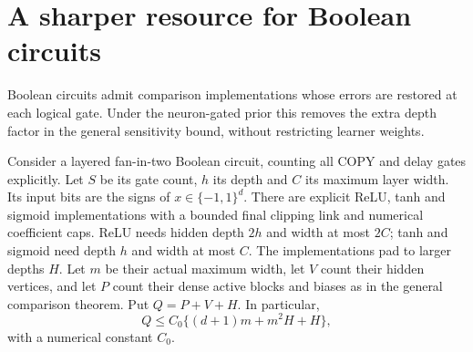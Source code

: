 \section{A sharper resource for Boolean circuits}
\label{sec:ard-Boolean-restoration}
Boolean circuits admit comparison implementations whose errors are restored at each logical gate. Under the neuron-gated prior this removes the extra depth factor in the general sensitivity bound, without restricting learner weights.

Consider a layered fan-in-two Boolean circuit, counting all COPY and delay gates explicitly. Let $S$ be its gate count, $h$ its depth and $C$ its maximum layer width. Its input bits are the signs of $x\in\{-1,1\}^d$. There are explicit ReLU, tanh and sigmoid implementations with a bounded final clipping link and numerical coefficient caps. ReLU needs hidden depth $2h$ and width at most $2C$; tanh and sigmoid need depth $h$ and width at most $C$. The implementations pad to larger depths $H$. Let $m$ be their actual maximum width, let $V$ count their hidden vertices, and let $P$ count their dense active blocks and biases as in the general comparison theorem. Put $Q=P+V+H$. In particular,
\[
 Q\le C_0\{(d+1)m+m^2H+H\},
\]
with a numerical constant $C_0$.

